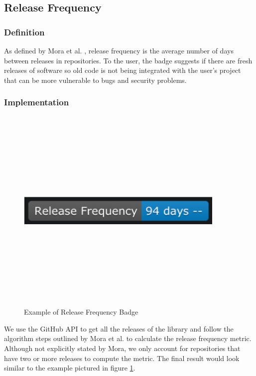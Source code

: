 \documentclass[12pt, letterpaper]{article}
\begin{document}
\subsection{Release Frequency}
\subsubsection{Definition}
As defined by Mora et al. \cite{metrics}, release frequency is the average number of days between
releases in repositories. 
To the user, the badge suggests if there are fresh releases of software so old code is not being 
integrated with the user's 
project that can be more vulnerable to bugs and security problems.

\subsubsection{Implementation}

\begin{figure}[!htb]
    \centerline{
        \includegraphics[width=10cm,height=10cm,keepaspectratio=true]{releasebadge}
    }
    \caption{
        Example of Release Frequency Badge
    }
    \label{releasebadge}
\end{figure}

We use the GitHub \cite{github} API to get all the releases of the library and follow the algorithm
steps outlined by Mora et al. \cite{metrics} to calculate the release frequency metric.
Although not explicitly stated by Mora, we only account for repositories that have two or more releases to compute
the metric. The final result would look similar to the example pictured in figure \ref{releasebadge}.
\end{document}
